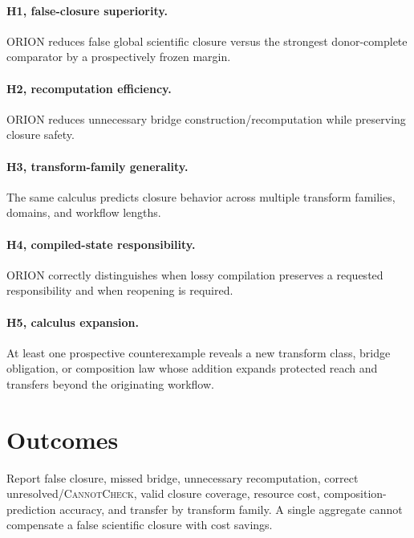 \documentclass[11pt]{article}
\begin{document}
\paragraph{H1, false-closure superiority.}
ORION reduces false global scientific closure versus the strongest donor-complete comparator by a prospectively frozen margin.

\paragraph{H2, recomputation efficiency.}
ORION reduces unnecessary bridge construction/recomputation while preserving closure safety.

\paragraph{H3, transform-family generality.}
The same calculus predicts closure behavior across multiple transform families, domains, and workflow lengths.

\paragraph{H4, compiled-state responsibility.}
ORION correctly distinguishes when lossy compilation preserves a requested responsibility and when reopening is required.

\paragraph{H5, calculus expansion.}
At least one prospective counterexample reveals a new transform class, bridge obligation, or composition law whose addition expands protected reach and transfers beyond the originating workflow.

\section{Outcomes}
Report false closure, missed bridge, unnecessary recomputation, correct unresolved/\textsc{CannotCheck}, valid closure coverage, resource cost, composition-prediction accuracy, and transfer by transform family. A single aggregate cannot compensate a false scientific closure with cost savings.
\end{document}
